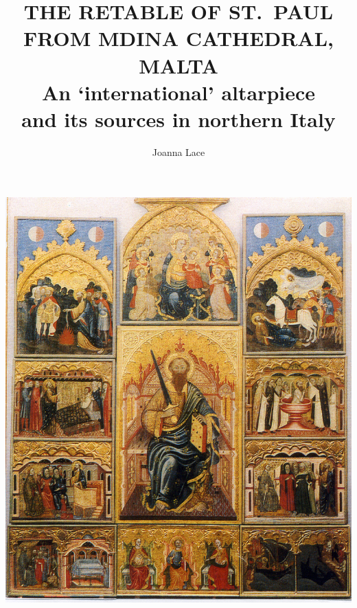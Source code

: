 \documentclass[a4paper,12pt]{article}
\begin{document}
\title{THE RETABLE OF ST.~PAUL\\ FROM MDINA CATHEDRAL, MALTA\\
An `international' altarpiece\\ and its sources in northern Italy}
\author{Joanna Lace}
\date{}
\maketitle
\begin{center}
\includegraphics[width=15cm]{pics/front.png}
\end{center}
\newpage
\end{document}
